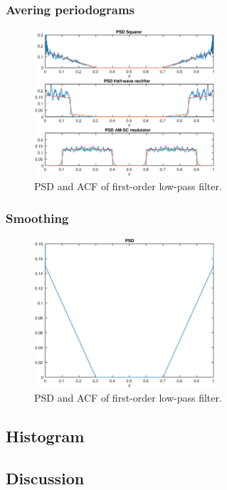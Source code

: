 \subsubsection{Avering periodograms}
\begin{figure}[h]
\centering
\includegraphics[width=0.6\textwidth]{bilder/Lab2/Lab2fig8.eps}
\caption{PSD and ACF of first-order low-pass filter.}
\label{fig:Lab1fig1}
\end{figure}

\subsubsection{Smoothing}
\begin{figure}[h]
\centering
\includegraphics[width=0.6\textwidth]{bilder/Lab2/Lab2fig1.eps}
\caption{PSD and ACF of first-order low-pass filter.}
\label{fig:Lab1fig1}
\end{figure}


\subsection{Histogram}



\subsection{Discussion}

